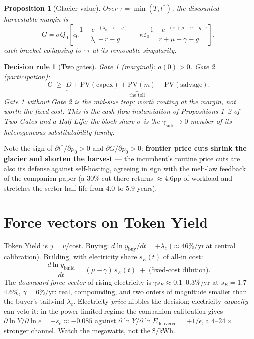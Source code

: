 \documentclass[11pt]{article}
\newtheorem{prop}{Proposition}
\newtheorem*{rule*}{Decision rule}
\begin{document}
\begin{prop}[Glacier value]
Over $\tau=\min(T,t^\ast)$, the discounted harvestable margin is
\begin{equation}
G=\sigma Q_0\!\left[c_0\frac{1-e^{-(\lambda_c+r-g)\tau}}{\lambda_c+r-g}
-\kappa\varepsilon_0\frac{1-e^{-(r+\mu-\gamma-g)\tau}}{r+\mu-\gamma-g}\right],
\end{equation}
each bracket collapsing to $\cdot\,\tau$ at its removable singularity.
\end{prop}

\begin{rule*}[Two gates]
\emph{Gate 1 (marginal): $a(0)>0$. Gate 2 (participation):}
\begin{equation}
G \;\ge\; \underbrace{D+\mathrm{PV}(\mathrm{capex})+\mathrm{PV}(m)-\mathrm{PV}(\mathrm{salvage})}_{\text{the toll}}.
\end{equation}
Gate 1 without Gate 2 is the mid-size trap: worth routing at the margin, not worth the
fixed cost. This is the cash-flow instantiation of Propositions 1--2 of \emph{Two Gates
and a Half-Life}; the block share $\sigma$ is the $\gamma_{\mathrm{sub}}\to0$ member of its
heterogeneous-substitutability family.
\end{rule*}

Note the sign of $\partial t^\ast/\partial p_0>0$ and $\partial G/\partial p_0>0$:
\textbf{frontier price cuts shrink the glacier and shorten the harvest} --- the incumbent's
routine price cuts are also its defense against self-hosting, agreeing in sign with the
melt-law feedback of the companion paper (a 30\% cut there returns $\approx4.6$pp of
workload and stretches the sector half-life from $4.0$ to $5.9$ years).

\section{Force vectors on Token Yield}
Token Yield is $y=v/\text{cost}$. Buying: $d\ln y_{\mathrm{buy}}/dt=+\lambda_c$
($\approx46\%/$yr at central calibration). Building, with electricity share
$s_E(t)$ of all-in cost:
\begin{equation}
\frac{d\ln y_{\mathrm{build}}}{dt}=(\mu-\gamma)\,s_E(t)\;+\;\text{(fixed-cost dilution)}.
\end{equation}
The \emph{downward force vector} of rising electricity is $\gamma s_E \approx
0.1$--$0.3\%$/yr at $s_E=1.7$--$4.6\%$, $\gamma=6\%$/yr: real, compounding, and two orders
of magnitude smaller than the buyer's tailwind $\lambda_c$. Electricity \emph{price} nibbles
the decision; electricity \emph{capacity} can veto it: in the power-limited regime the
companion calibration gives $\partial\ln Y/\partial\ln e=-s_e\approx-0.085$ against
$\partial\ln Y/\partial\ln E_{\mathrm{delivered}}=+1/\epsilon$, a $4$--$24\times$ stronger
channel. Watch the megawatts, not the \$/kWh.
\end{document}
